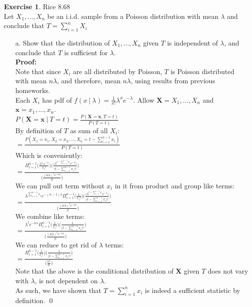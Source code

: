 \documentclass[11pt]{article}
\theoremstyle{definition}
\newtheorem{exercise}[theorem]{Exercise}
\newcommand{\st}{\ |\ }
\newcommand{\V}{\vspace{0.3cm}\\}
\newcommand{\pro}{\V \textbf{Proof:} \V}
\begin{document}
\begin{exercise} Rice 8.68\\
Let $X_1,...,X_n$ be an i.i.d. sample from a Poisson distribution with mean $\lambda$ and conclude that $T=\sum_{i=1}^n X_i$
\begin{enumerate}
\item[a.] Show that the distribution of $X_1,...,X_n$ given $T$ is independent of $\lambda$, and conclude that $T$ is sufficient for $\lambda$. \pro
Note that since $X_i$ are all distributed by Poisson, $T$ is Poisson distributed with mean $n\lambda$, and therefore, mean $n\lambda$, using results from previous homeworks. \V
Each $X_i$ has pdf of $f(x \st \lambda) = \frac{1}{x!}\lambda^x e^{-\lambda}$.
Allow $\textbf{X} = X_1,...,X_n$ and $\textbf{x} = x_1,...,x_n$. \V
$\displaystyle P(\textbf{X} = \textbf{x} \st T = t) = \frac{P(\textbf{X} = \textbf{x}, T = t)}{P(T=t)}$ \V
By definition of $T$ as sum of all $X_i$:\\
$ = \displaystyle \frac{P(X_1 = x_1, X_2 = x_2,...,X_n = t-\sum_{i=1}^{n-1} x_i)}{P(T=t)}$ \V
Which is conveniently: \\
$ = \displaystyle \frac{ \displaystyle \Pi_{i=1}^{n-1}\Big(\frac{ \lambda^{x_i} e^{-\lambda}}{x_i!} \Big) \Big(\frac{\big(\lambda^{t- \sum_{i=1}^{n-1} x_i} e^{-\lambda} \big) }{\big(t - \sum_{i=1}^{n-1} x_i \big)!} \Big)}{\Big( \displaystyle \frac{(n\lambda)^t e^{-n\lambda}}{t!} \Big)}$ \V
We can pull out term without $x_i$ in it from product and group like terms:\\
$ = \displaystyle \frac{ \displaystyle  \lambda^{\sum_{i=1}^{n-1}x_i} e^{-(n-1)\lambda}\Pi_{i=1}^{n-1}\Big(\frac{1}{x_i!} \Big) \Big(\frac{\big(\lambda^{t- \sum_{i=1}^{n-1} x_i} e^{-\lambda} \big) }{\big(t - \sum_{i=1}^{n-1} x_i \big)!} \Big)}{\Big( \displaystyle \frac{(n\lambda)^t e^{-n\lambda}}{t!} \Big)}$ \V
We combine like terms:\\
$ = \displaystyle \frac{ \displaystyle  \lambda^{t} e^{-n\lambda}\Pi_{i=1}^{n-1}\Big(\frac{1}{x_i!} \Big) \Big(\frac{1 }{\big(t - \sum_{i=1}^{n-1} x_i \big)!} \Big)}{\Big( \displaystyle \frac{(n\lambda)^t e^{-n\lambda}}{t!} \Big)}$ \V
We can reduce to get rid of $\lambda$ terms: \\
$ = \displaystyle \frac{ \displaystyle   \Pi_{i=1}^{n-1}\Big(\frac{1}{x_i!} \Big) \Big(\frac{1 }{\big(t - \sum_{i=1}^{n-1} x_i \big)!} \Big)}{\Big( \displaystyle \frac{n^t}{t!} \Big)}$ \V
Note that the above is the conditional distribution of $\textbf{X}$ given $T$ does not vary with $\lambda$, is not dependent on $\lambda$. \V
 As such, we have shown that $T = \sum_{i=1}^n x_i$ is indeed a sufficient statistic by definition. \qed
 

\end{enumerate}
\end{exercise}
\end{document}
